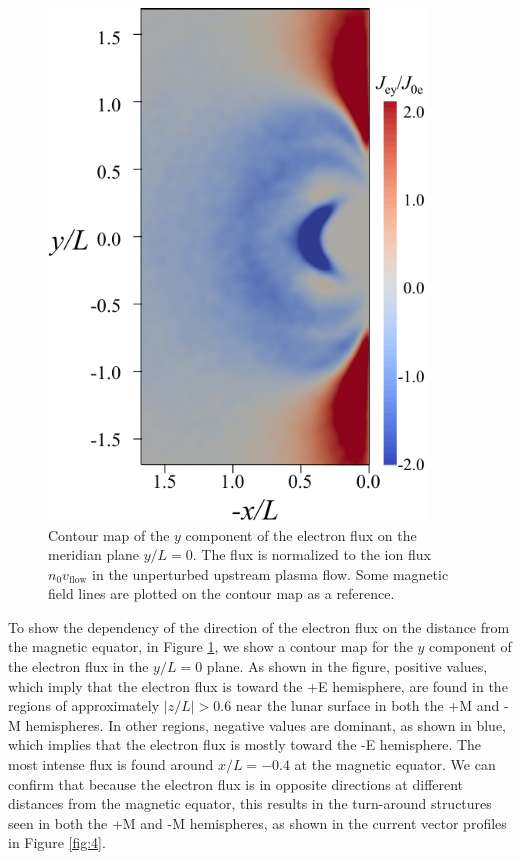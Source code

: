 \documentclass[draft,jgrga]{agutex2015}
\begin{document}
\begin{article}
\begin{figure}[h]
\centering
\noindent\includegraphics[width=10cm]{./figures/Fig_7_bb-crop.pdf}
\caption{
Contour map of the $y$ component of the electron flux 
on the meridian plane $y/L=0$.
The flux is normalized to the ion flux $n_\mathrm{0}v_\mathrm{flow}$
in the unperturbed upstream plasma flow.
Some magnetic field lines are plotted on the contour map as a reference.
}
\label{fig:7} 
\end{figure}

To show the dependency of the direction of the electron flux on the distance
from the magnetic equator, in Figure \ref{fig:7},
we show a contour map for the $y$ component of the electron flux 
in the $y/L=0$ plane.
As shown in the figure, 
positive values, which imply that the electron flux is toward the +E hemisphere,
are found in the regions of approximately $|z/L| > 0.6$ near the lunar surface
in both the +M and -M hemispheres.
In other regions, 
negative values are dominant, as shown in blue, 
which implies that the electron flux is mostly toward the -E hemisphere. 
The most intense flux is found 
around $x/L=-0.4$ at the magnetic equator.
We can confirm that because the electron flux is in opposite directions 
at different distances from the magnetic equator, this results in the 
turn-around structures seen in both the +M and -M hemispheres, 
as shown in the current vector profiles in Figure \ref{fig:4}.



\end{article}
\end{document}
